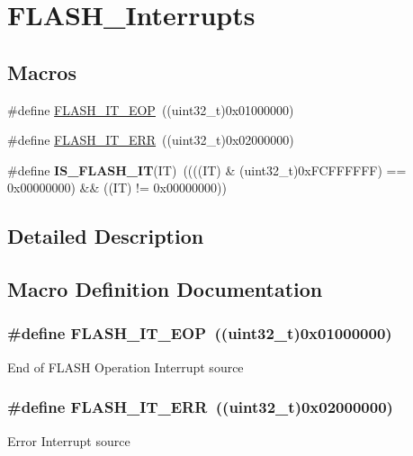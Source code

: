 \hypertarget{group___f_l_a_s_h___interrupts}{}\section{F\+L\+A\+S\+H\+\_\+\+Interrupts}
\label{group___f_l_a_s_h___interrupts}
\subsection*{Macros}
\begin{DoxyCompactItemize}
\item 
\#define \hyperlink{group___f_l_a_s_h___interrupts_gaea20e80e1806d58a7544cfe8659e7f11}{F\+L\+A\+S\+H\+\_\+\+I\+T\+\_\+\+E\+O\+P}~((uint32\+\_\+t)0x01000000)
\item 
\#define \hyperlink{group___f_l_a_s_h___interrupts_ga4e2c23ab8c1b9a5ee49bf6d695d9ae8c}{F\+L\+A\+S\+H\+\_\+\+I\+T\+\_\+\+E\+R\+R}~((uint32\+\_\+t)0x02000000)
\item 
\hypertarget{group___f_l_a_s_h___interrupts_ga46ee77d0be1f3e0a14ded0651163ae11}{}\#define {\bfseries I\+S\+\_\+\+F\+L\+A\+S\+H\+\_\+\+I\+T}(I\+T)~((((I\+T) \& (uint32\+\_\+t)0x\+F\+C\+F\+F\+F\+F\+F\+F) == 0x00000000) \&\& ((\+I\+T) != 0x00000000))\label{group___f_l_a_s_h___interrupts_ga46ee77d0be1f3e0a14ded0651163ae11}

\end{DoxyCompactItemize}


\subsection{Detailed Description}


\subsection{Macro Definition Documentation}
\hypertarget{group___f_l_a_s_h___interrupts_gaea20e80e1806d58a7544cfe8659e7f11}{}
\subsubsection[{F\+L\+A\+S\+H\+\_\+\+I\+T\+\_\+\+E\+O\+P}]{\setlength{\rightskip}{0pt plus 5cm}\#define F\+L\+A\+S\+H\+\_\+\+I\+T\+\_\+\+E\+O\+P~((uint32\+\_\+t)0x01000000)}\label{group___f_l_a_s_h___interrupts_gaea20e80e1806d58a7544cfe8659e7f11}
End of F\+L\+A\+S\+H Operation Interrupt source \hypertarget{group___f_l_a_s_h___interrupts_ga4e2c23ab8c1b9a5ee49bf6d695d9ae8c}{}
\subsubsection[{F\+L\+A\+S\+H\+\_\+\+I\+T\+\_\+\+E\+R\+R}]{\setlength{\rightskip}{0pt plus 5cm}\#define F\+L\+A\+S\+H\+\_\+\+I\+T\+\_\+\+E\+R\+R~((uint32\+\_\+t)0x02000000)}\label{group___f_l_a_s_h___interrupts_ga4e2c23ab8c1b9a5ee49bf6d695d9ae8c}
Error Interrupt source 